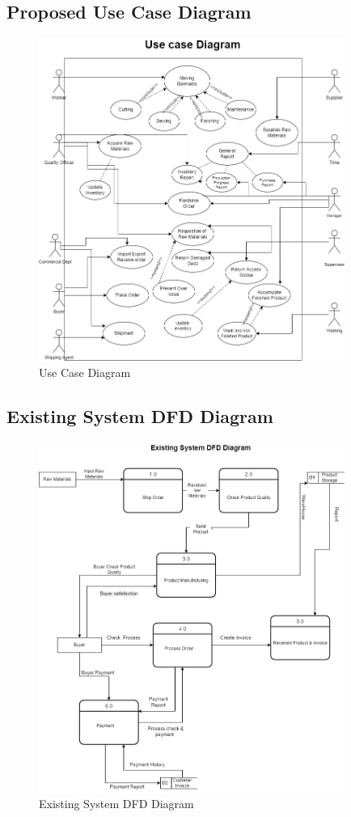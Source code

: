 \documentclass{article}
\begin{document}
\subsection{Proposed Use Case Diagram}
\begin{figure}[h!]
    \centering
    \includegraphics[width=10cm]{img/usecachdia.png}
    \caption{Use Case Diagram}
    \label{fig:my_label}
\end{figure}
\newpage
\subsection{Existing System DFD Diagram}
\begin{figure}[h]
    \centering
    \includegraphics[width=10cm]{img/exisitingdfd.png}
    \caption{Existing System DFD Diagram}
\end{figure}
\newpage
\end{document}
